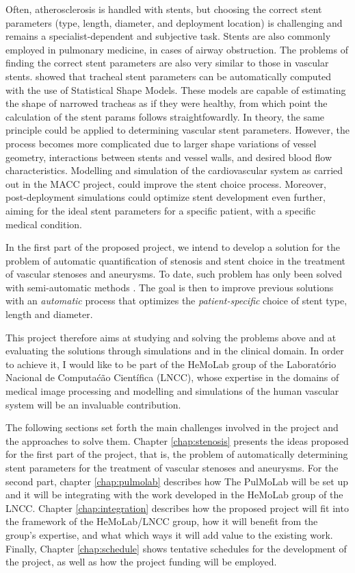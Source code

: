 Often, atherosclerosis is handled with stents, but choosing the correct stent parameters (type, length, diameter, and deployment location) is challenging and remains a specialist-dependent and subjective task. Stents are also commonly employed in pulmonary medicine, in cases of airway obstruction. The problems of finding the correct stent parameters are also very similar to those in vascular stents. \citet{Pinho:Trachea4} showed that tracheal stent parameters can be automatically computed with the use of Statistical Shape Models. These models are capable of estimating the shape of narrowed tracheas as if they were healthy, from which point the calculation of the stent params follows straightfowardly. In theory, the same principle could be applied to determining vascular stent parameters. However, the process becomes more complicated due to larger shape variations of vessel geometry, interactions between stents and vessel walls, and desired blood flow characteristics. Modelling and simulation of the cardiovascular system as carried out in the MACC project, could improve the stent choice process. Moreover, post-deployment simulations could optimize stent development even further, aiming for the ideal stent parameters for a specific patient, with a specific medical condition. 

In the first part of the proposed project, we intend to develop a solution for the problem of automatic quantification of stenosis and stent choice in the treatment of vascular stenoses and aneurysms. To date, such problem has only been solved with semi-automatic methods \citep{Gremse01092011,Scherl200721,HERN-06b,Bemmel}. The goal is then to improve previous solutions with an {\em automatic} process that optimizes the {\em patient-specific} choice of stent type, length and diameter. 




This project therefore aims at studying and solving the problems above and at evaluating the solutions through simulations and in the clinical domain. In order to achieve it, I would like to be part of the HeMoLab group of the Laborat\'orio Nacional de Computa\'c\~ao Cient\'ifica (LNCC), whose expertise in the domains of medical image processing and modelling and simulations of the human vascular system will be an invaluable contribution.

The following sections set forth the main challenges involved in the project and the approaches to solve them. Chapter \ref{chap:stenosis} presents the ideas proposed for the first part of the project, that is, the problem of automatically determining stent parameters for the treatment of vascular stenoses and aneurysms. For the second part, chapter \ref{chap:pulmolab} describes how The PulMoLab will be set up and it will be integrating with the work developed in the HeMoLab group of the LNCC. Chapter \ref{chap:integration} describes how the proposed project will fit into the framework of the HeMoLab/LNCC group, how it will benefit from the group's expertise, and what which ways it will add value to the existing work. Finally, Chapter \ref{chap:schedule} shows tentative schedules for the development of the project, as well as how the project funding will be employed.


